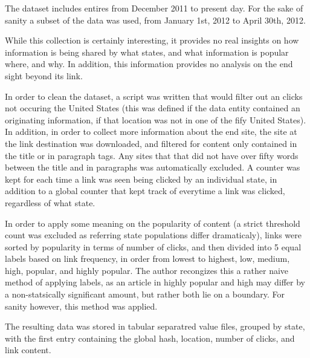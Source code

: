 \documentclass[11pt]{article}
\begin{document}
The dataset includes entires from December 2011 to present day.  For the sake of sanity a subset of the data was used, from January 1st, 2012 to April 30th, 2012. 

While this collection is certainly interesting, it provides no real insights on how information is being shared by what states, and what information is popular where, and why.  In addition, this information provides no analysis on the end sight beyond its link.

In order to clean the dataset, a script was written that would filter out an clicks not occuring the United States (this was defined if the data 
entity contained an originating information, if that location was not in one of the fify United States).  In addition, in order to collect more information about the end site, the site at the link destination was downloaded, and filtered for content only contained in the title or in paragraph tags.  Any sites that that did not have over fifty words between the title 
and in paragraphs was automatically excluded.  A counter was kept for each time a link was seen being clicked by an individual state, in addition to a global counter that kept track of everytime a link was clicked, regardless of what state. 


In order to apply some meaning on the popularity of content (a strict threshold count was excluded as referring state populations differ dramaticaly), links were sorted by popularity in terms of number of clicks, and then divided into 5 equal labels based on link frequency, in order from lowest to highest, low, medium, high, popular, and highly popular. The author recongizes this a rather naive method of applying labels, as an article in highly popular and high may differ by a non-statsically significant amount, but rather both lie on a boundary.  For sanity however, this method was applied.

The resulting data was stored in tabular separatred value files, grouped by state, with the first entry containing the global hash, location, number of clicks, and link content.  
\end{document}
